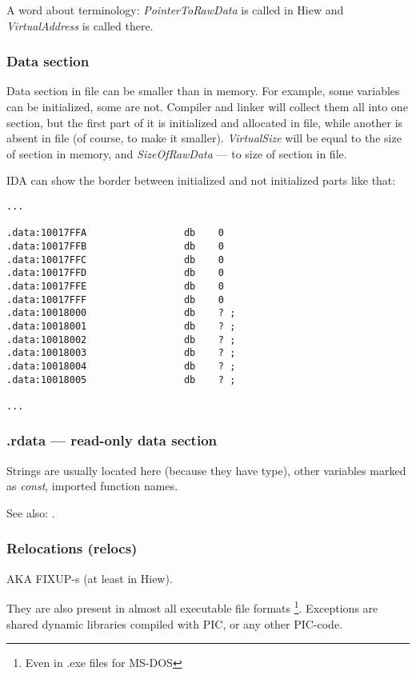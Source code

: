 A word about terminology: \emph{PointerToRawData} is called  in Hiew
and \emph{VirtualAddress} is called  there.

\subsubsection{Data section}

Data section in file can be smaller than in memory.
For example, some variables can be initialized, some are not.
Compiler and linker will collect them all into one section, but the first part of it is initialized and allocated in file,
while another is absent in file (of course, to make it smaller).
\emph{VirtualSize} will be equal to the size of section in memory, and \emph{SizeOfRawData} --- to
size of section in file.

IDA can show the border between initialized and not initialized parts like that:

\begin{lstlisting}[style=customasmx86]
...

.data:10017FFA                 db    0
.data:10017FFB                 db    0
.data:10017FFC                 db    0
.data:10017FFD                 db    0
.data:10017FFE                 db    0
.data:10017FFF                 db    0
.data:10018000                 db    ? ;
.data:10018001                 db    ? ;
.data:10018002                 db    ? ;
.data:10018003                 db    ? ;
.data:10018004                 db    ? ;
.data:10018005                 db    ? ;

...
\end{lstlisting}

\subsubsection{.rdata --- read-only data section}

Strings are usually located here (because they have  type), other variables marked as \emph{const},
imported function names.

See also: .

\subsubsection{Relocations (relocs)}
\label{subsec:relocs}

\ac{AKA} FIXUP-s (at least in Hiew).

They are also present in almost all executable file formats
\footnote{Even in .exe files for MS-DOS}.
Exceptions are shared dynamic libraries compiled with \ac{PIC}, or any other \ac{PIC}-code.

